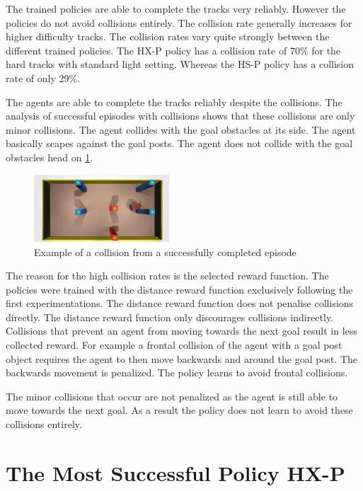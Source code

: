 The trained policies are able to complete the tracks very reliably. However the policies do not avoid collisions entirely. The collision rate generally increases for higher difficulty tracks. The collision rates vary quite strongly between the different trained policies. The \ac{HX-P} policy has a collision rate of 70\% for the hard tracks with standard light setting. Whereas the \ac{HS-P} policy has a collision rate of only 29\%.

The agents are able to complete the tracks reliably despite the collisions. The analysis of successful episodes with collisions shows that these collisions are only minor collisions. The agent collides with the goal obstacles at its side. The agent basically scapes against the goal posts. The agent does not collide with the goal obstacles head on \ref{fig:example_collision_success}.

\begin{figure}
    \centering
    \includegraphics[width=0.45\textwidth]{Bilder/example_minor_collision_topview_frame_1295.png}
    \caption{Example of a collision from a successfully completed episode}
    \label{fig:example_collision_success}
\end{figure}

The reason for the high collision rates is the selected reward function. The policies were trained with the distance reward function exclusively following the first experimentations. The distance reward function does not penalise collisions directly. The distance reward function only discourages collisions indirectly. Collisions that prevent an agent from moving towards the next goal result in less collected reward. For example a frontal collision of the agent with a goal post object requires the agent to then move backwards and around the goal post. The backwards movement is penalized. The policy learns to avoid frontal collisions.

The minor collisions that occur are not penalized as the agent is still able to move towards the next goal. As a result the policy does not learn to avoid these collisions entirely.


\section{The Most Successful Policy \ac{HX-P}}
\label{sec:most_successful_policy}

